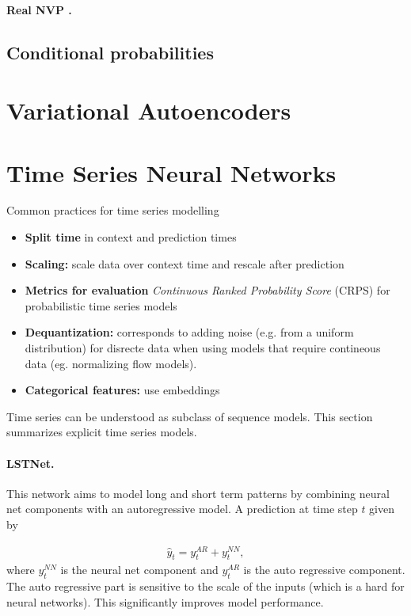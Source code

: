 \documentclass[12pt,a4paper]{article}
\begin{document}
\paragraph{Real NVP \cite{dinh_2016_real_nvp}.}

\subsection{Conditional probabilities}


\section{Variational Autoencoders}
\cite{Kingma_2019_AnIntroductionToVariationalAutoencoders}


\section{Time Series Neural Networks}
Common practices for time series modelling
\begin{itemize}
	\item \textbf{Split time} in context and prediction times
	\item \textbf{Scaling:} scale data over context time and rescale after prediction
	\item \textbf{Metrics for evaluation} \textit{Continuous Ranked Probability Score} (CRPS) for probabilistic time series models
	\item \textbf{Dequantization:} corresponds to adding noise (e.g. from a uniform distribution) for disrecte data when using models that require contineous data (eg. normalizing flow models).
	\item \textbf{Categorical features:} use embeddings 
\end{itemize}
Time series can be understood as subclass of sequence models. This section summarizes explicit time series models.
\paragraph{LSTNet.} This network \cite{lstnet_2017} aims to model long and short term patterns by combining neural net components with an autoregressive model. A prediction at time step $t$ given by

\begin{align}
	\hat y_t = y_t^{AR} + y_t^{NN},
\end{align}
where $y_t^{NN}$ is the  neural net component and $y_t^{AR}$ is the auto regressive component. The auto regressive part is sensitive to the scale of the inputs (which is a hard for neural networks). This significantly improves model performance. 
\end{document}
